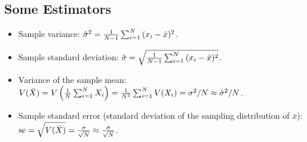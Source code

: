     \subsection{Some Estimators}
        \begin{itemize}
            \item Sample variance: $\hat{\sigma}^2 = \frac{1}{N-1} \sum_{i=1}^{N}{(x_i - \bar{x})^2}$.
            \item Sample standard deviation: $\hat{\sigma} = \sqrt{\frac{1}{N-1} \sum_{i=1}^{N}{(x_i - \bar{x})^2}}$.
            \item Variance of the sample mean: $V(\bar{X}) = V\left( \frac{1}{N}\sum_{i=1}^{N}{X_i} \right) = \frac{1}{N^2}\sum_{i=1}^{N}{V(X_i)} = \sigma^2 / N \approx \hat{\sigma}^2 / N$.
            \item Sample standard error (standard deviation of the sampling distribution of $\bar{x}$): $\text{se} = \sqrt{V(\bar{X})} =  \frac{\sigma}{\sqrt{N}} \approx \frac{\hat{\sigma}}{\sqrt{N}}$.
        \end{itemize}


